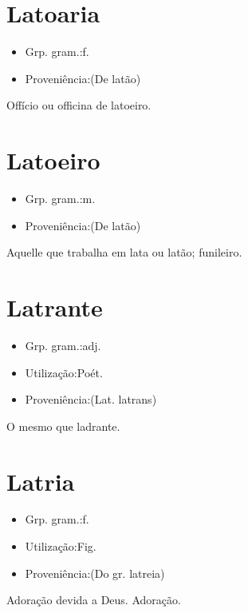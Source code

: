 \section{Latoaria}
\begin{itemize}
\item {Grp. gram.:f.}
\end{itemize}
\begin{itemize}
\item {Proveniência:(De \textunderscore latão\textunderscore )}
\end{itemize}
Offício ou officina de latoeiro.
\section{Latoeiro}
\begin{itemize}
\item {Grp. gram.:m.}
\end{itemize}
\begin{itemize}
\item {Proveniência:(De \textunderscore latão\textunderscore )}
\end{itemize}
Aquelle que trabalha em lata ou latão; funileiro.
\section{Latrante}
\begin{itemize}
\item {Grp. gram.:adj.}
\end{itemize}
\begin{itemize}
\item {Utilização:Poét.}
\end{itemize}
\begin{itemize}
\item {Proveniência:(Lat. \textunderscore latrans\textunderscore )}
\end{itemize}
O mesmo que \textunderscore ladrante\textunderscore .
\section{Latria}
\begin{itemize}
\item {Grp. gram.:f.}
\end{itemize}
\begin{itemize}
\item {Utilização:Fig.}
\end{itemize}
\begin{itemize}
\item {Proveniência:(Do gr. \textunderscore latreia\textunderscore )}
\end{itemize}
Adoração devida a Deus.
Adoração.
